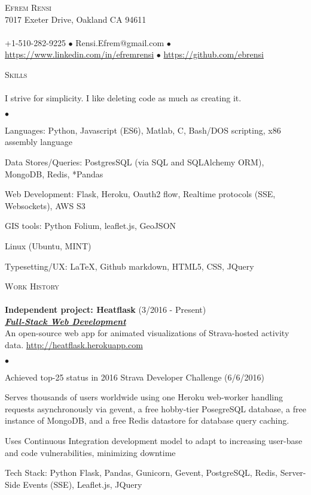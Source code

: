 \documentclass{article}
\newcommand{\lineunder}{\vspace*{-8pt} \\ \hspace*{-18pt} \hrulefill \\}
\newcommand{\header}[1]{{\hspace*{-15pt}\vspace*{6pt} \textsc{#1}} \vspace*{-6pt} \lineunder}
\newcommand{\employer}[3]{{ \textbf{#1} (#2)\\ \underline{\textbf{\emph{#3}}}\\  }}
\newcommand{\contact}[3]{
\vspace*{-8pt}
\begin{center}
{\LARGE \scshape {#1}}\\
#2 \lineunder
#3
\end{center}
\vspace*{-8pt}
}
\newenvironment{achievements}{\begin{list}{$\bullet$}{\topsep 0pt \itemsep -2pt}}{\vspace*{4pt}\end{list}}
\begin{document}
\small
\smallskip
\vspace*{-44pt}

\contact{Efrem Rensi}
{7017 Exeter Drive, Oakland CA 94611}
{+1-510-282-9225 $\bullet$ Rensi.Efrem@gmail.com  $\bullet$ \url{https://www.linkedin.com/in/efremrensi}
$\bullet$ \url{https://github.com/ebrensi}
}
\smallskip

\header{Skills}
I strive for simplicity. I like deleting code as much as creating it.
\begin{achievements}
\item Languages: Python, Javascript (ES6), Matlab, C, Bash/DOS scripting, x86 assembly language
\item Data Stores/Queries: PostgresSQL (via SQL and SQLAlchemy ORM), MongoDB, Redis, *Pandas
\item Web Development: Flask, Heroku, Oauth2 flow, Realtime protocols (SSE, Websockets), AWS S3 
\item GIS tools:  Python Folium, leaflet.js, GeoJSON
\item Linux (Ubuntu, MINT) 
\item Typesetting/UX: \LaTeX, Github markdown, HTML5, CSS, JQuery 
\end{achievements}
\medskip

\header{Work History}
\employer{Independent project: Heatflask}{3/2016 - Present}{Full-Stack Web Development}
 An open-source web app for animated visualizations of Strava-hosted activity data. \url{http://heatflask.herokuapp.com}
\begin{achievements}
\item Achieved top-25 status in 2016 Strava Developer Challenge (6/6/2016) 
\item Serves thousands of users worldwide using one Heroku web-worker handling requests asynchronously via gevent, a free hobby-tier PosegreSQL database, a free instance of MongoDB, and a free Redis datastore for database query caching.
\item Uses Continuous Integration development model to adapt to increasing user-base and code vulnerabilities, minimizing downtime
\item Tech Stack: Python Flask, Pandas, Gunicorn, Gevent, PostgreSQL, Redis, Server-Side Events (SSE), Leaflet.js, JQuery
\end{achievements}
\end{document}
